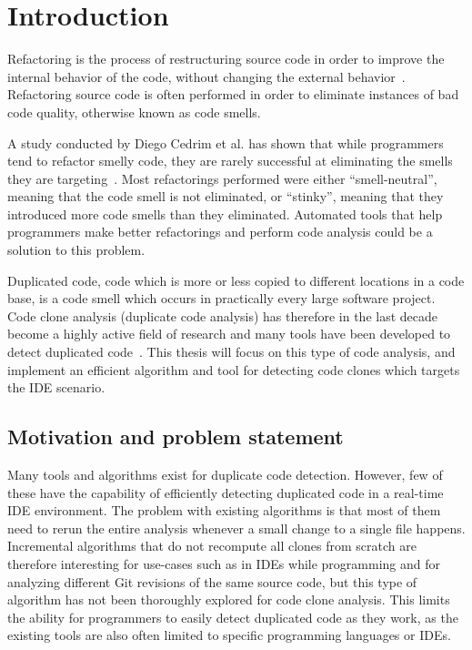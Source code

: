 \chapter{Introduction}

Refactoring is the process of restructuring source code in order to improve the internal
behavior of the code, without changing the external behavior~\cite[9]{fowlerrefactoring}.
Refactoring source code is often performed in order to eliminate instances of bad code
quality, otherwise known as code smells.

A study conducted by Diego Cedrim et al. has shown that while programmers tend to refactor
smelly code, they are rarely successful at eliminating the smells they are
targeting~\cite{Rohit_Gheyi_Impact}. Most refactorings performed were either
``smell-neutral'', meaning that the code smell is not eliminated, or ``stinky'',
meaning that they introduced more code smells than they eliminated. Automated tools that
help programmers make better refactorings and perform code analysis could be a solution to
this problem.

Duplicated code, code which is more or less copied to different locations in a code base,
is a code smell which occurs in practically every large software project. Code clone
analysis (duplicate code analysis) has therefore in the last decade become a highly active
field of research and many tools have been developed to detect duplicated
code~\cite[6]{Inoue_introduction_to_cc}. This thesis will focus on this type of code
analysis, and implement an efficient algorithm and tool for detecting code clones which
targets the IDE scenario.

\section{Motivation and problem statement}

Many tools and algorithms exist for duplicate code detection. However, few of these have
the capability of efficiently detecting duplicated code in a real-time IDE environment.
The problem with existing algorithms is that most of them need to rerun the entire
analysis whenever a small change to a single file happens. Incremental algorithms that do
not recompute all clones from scratch are therefore interesting for use-cases such as in
IDEs while programming and for analyzing different Git revisions of the same source code,
but this type of algorithm has not been thoroughly explored for code clone analysis. This
limits the ability for programmers to easily detect duplicated code as they work, as the
existing tools are also often limited to specific programming languages or IDEs.

